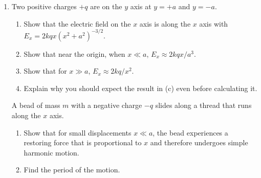 \documentclass{../../../oss-apphys}
\begin{document}
\begin{enumerate}[leftmargin=15pt]
%  
  
\item Two positive charges $+q$ are on the $y$ axis at $y=+a$ and $y=-a$.
  \begin{enumerate}[leftmargin=15pt]
  \item Show that the electric field on the $x$ axis is along the $x$ axis with
    $E_x=2kqx(x^2+a^2)^{-3/2}$.
  \item Show that near the origin, when $x\ll a$, $E_x\approx 2kqx/a^3$.
  \item Show that for $x\gg a$, $E_x\approx 2kq/x^2$.
  \item Explain why you should expect the result in (c) even before calculating
    it.
  \end{enumerate}
  A bead of mass $m$ with a negative charge $-q$ slides along a thread that
  runs along the $x$ axis.
  \begin{enumerate}[start=5,leftmargin=15pt]
  \item Show that for small displacements $x\ll a$, the bead experiences a
    restoring force that is proportional to $x$ and therefore undergoes
    simple harmonic motion.
  \item Find the period of the motion.
  \end{enumerate}


\end{enumerate}
\end{document}
